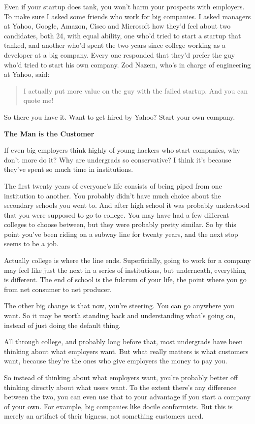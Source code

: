 Even if your startup does tank, you won't harm your prospects with
employers. To make sure I asked some friends who work for big companies.
I asked managers at Yahoo, Google, Amazon, Cisco and Microsoft how
they'd feel about two candidates, both 24, with equal ability, one who'd
tried to start a startup that tanked, and another who'd spent the two
years since college working as a developer at a big company. Every one
responded that they'd prefer the guy who'd tried to start his own
company. Zod Nazem, who's in charge of engineering at Yahoo, said:

\begin{quote}
I actually put more value on the guy with the failed startup. And you
can quote me!
\end{quote}

So there you have it. Want to get hired by Yahoo? Start your own
company.

\textbf{The Man is the Customer}

If even big employers think highly of young hackers who start companies,
why don't more do it? Why are undergrads so conservative? I think it's
because they've spent so much time in institutions.

The first twenty years of everyone's life consists of being piped from
one institution to another. You probably didn't have much choice about
the secondary schools you went to. And after high school it was probably
understood that you were supposed to go to college. You may have had a
few different colleges to choose between, but they were probably pretty
similar. So by this point you've been riding on a subway line for twenty
years, and the next stop seems to be a job.

Actually college is where the line ends. Superficially, going to work
for a company may feel like just the next in a series of institutions,
but underneath, everything is different. The end of school is the
fulcrum of your life, the point where you go from net consumer to net
producer.

The other big change is that now, you're steering. You can go anywhere
you want. So it may be worth standing back and understanding what's
going on, instead of just doing the default thing.

All through college, and probably long before that, most undergrads have
been thinking about what employers want. But what really matters is what
customers want, because they're the ones who give employers the money to
pay you.

So instead of thinking about what employers want, you're probably better
off thinking directly about what users want. To the extent there's any
difference between the two, you can even use that to your advantage if
you start a company of your own. For example, big companies like docile
conformists. But this is merely an artifact of their bigness, not
something customers need.

